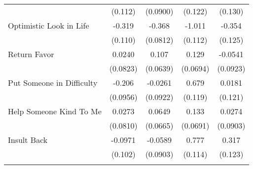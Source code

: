 {\begin{tabular}{l*{4}{c}}
            &     (0.112)         &    (0.0900)         &     (0.122)         &     (0.130)         \\
[1em]
Optimistic Look in Life&      -0.319\sym{**} &      -0.368\sym{***}&      -1.011\sym{***}&      -0.354\sym{**} \\
            &     (0.110)         &    (0.0812)         &     (0.112)         &     (0.125)         \\
[1em]
Return Favor&      0.0240         &       0.107         &       0.129         &     -0.0541         \\
            &    (0.0823)         &    (0.0639)         &    (0.0694)         &    (0.0923)         \\
[1em]
Put Someone in Difficulty&      -0.206\sym{*}  &     -0.0261         &       0.679\sym{***}&      0.0181         \\
            &    (0.0956)         &    (0.0922)         &     (0.119)         &     (0.121)         \\
[1em]
Help Someone Kind To Me&      0.0273         &      0.0649         &       0.133         &      0.0274         \\
            &    (0.0810)         &    (0.0665)         &    (0.0691)         &    (0.0903)         \\
[1em]
Insult Back &     -0.0971         &     -0.0589         &       0.777\sym{***}&       0.317\sym{*}  \\
            &     (0.102)         &    (0.0903)         &     (0.114)         &     (0.123)         \\
\hline\hline
{}\\
\end{tabular}
}
